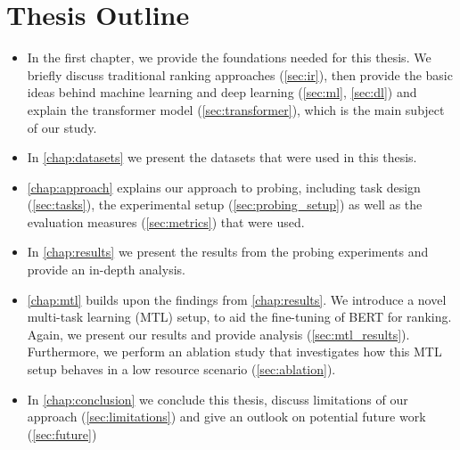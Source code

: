 \section{Thesis Outline}
\begin{itemize}
    \item In the first chapter, we provide the foundations needed for this thesis. We briefly discuss traditional ranking approaches (\autoref{sec:ir}), then provide the basic ideas behind machine learning and deep learning (\autoref{sec:ml}, \autoref{sec:dl}) and explain the transformer model (\autoref{sec:transformer}), which is the main subject of our study.
    \item In \autoref{chap:datasets} we present the datasets that were used in this thesis.
    \item \autoref{chap:approach} explains our approach to probing, including task design (\autoref{sec:tasks}), the experimental setup (\autoref{sec:probing_setup}) as well as the evaluation measures (\autoref{sec:metrics}) that were used.
    \item In \autoref{chap:results} we present the results from the probing experiments and provide an in-depth analysis.
    \item \autoref{chap:mtl} builds upon the findings from \autoref{chap:results}. We introduce a novel multi-task learning (MTL) setup, to aid the fine-tuning of BERT for ranking. Again, we present our results and provide analysis (\autoref{sec:mtl_results}). Furthermore, we perform an ablation study that investigates how this MTL setup behaves in a low resource scenario (\autoref{sec:ablation}).
    \item In \autoref{chap:conclusion} we conclude this thesis, discuss limitations of our approach (\autoref{sec:limitations}) and give an outlook on potential future work (\autoref{sec:future})
\end{itemize}
